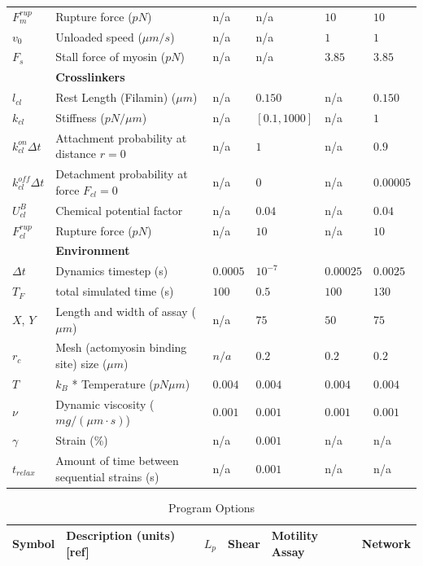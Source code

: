 \documentclass[12pt]{article}
\begin{document}
\begin{table}
\begin{tabular}{|C{1.5cm}|L{7cm}|C{1.5cm}|C{1.5cm}|C{2cm}|C{1.5cm}|}
    $F_m^{rup}$ & Rupture force ($pN$) & n/a & n/a & $10$ & $10$\\
    $v_0$ & Unloaded speed ($\mu m/s$) \cite{kron1986}&  n/a & n/a & $1$ & $1$\\
    $F_s$ & Stall force of myosin ($pN$)\cite{veigel2003}& n/a & n/a & $3.85$ & $3.85$\\
    \hline
    &\bf{Crosslinkers} & & & &\\
    \hline
    $l_{cl}$& Rest Length (Filamin) ($\mu m$)\cite{ferrer2008} & n/a &$0.150$ &n/a & $0.150$\\
    $k_{cl}$ & Stiffness ($pN/\mu m$)& n/a & $[0.1,1000]$ & n/a & $1$ \\
    $k^{on}_{cl}\Delta t$ & Attachment probability at distance $r=0$ & n/a & $1$ & n/a & $0.9$ \\
    $k^{off}_{cl}\Delta t$ & Detachment probability at force $F_{cl}=0$& n/a & $0$ & n/a & $0.00005$ \\
    $U_{cl}^B$ & Chemical potential factor& n/a & $0.04$ &n/a & $0.04$\\
    $F_{cl}^{rup}$& Rupture force ($pN$) \cite{ferrer2008}& n/a & $10$ & n/a & $10$ \\
    \hline
    &\bf{Environment} & & & &\\
    \hline
    $\Delta t$ & Dynamics timestep (s) & $0.0005$ & $10^{-7}$ & $0.00025$ & $0.0025$\\
    $T_F$& total simulated time (s) & $100$ & $0.5$ & $100$ & $130$\\
    $X$, $Y$ & Length and width of assay ($\mu m$)& n/a & $75$ & $50$ & $75$\\
    $r_c$ & Mesh (actomyosin binding site) size ($\mu m$) & $n/a$ & $0.2 $ & $0.2 $ & $0.2$\\
    $T$ & $k_B$ * Temperature ($pN\mu m$)& $0.004$ & $0.004$& $0.004$ & $0.004$\\
    $\nu$ & Dynamic viscosity ($mg/(\mu m \cdot s)$) & $0.001$& $0.001$& $0.001$ & $0.001$ \\
    $\gamma$ & Strain (\%) \cite{stricker2010}& n/a& $0.001$&n/a &n/a\\
    $t_{relax}$ & Amount of time between sequential strains (s)& n/a& $0.001$ &n/a & n/a \\
    \hline
  \end{tabular}
  \label{tab:params}
\end{table}
\begin{table}
  \caption{Program Options}
  \centering
  \begin{tabular}{|C{1.5cm}|L{7cm}|C{1.5cm}|C{1.5cm}|C{2cm}|C{1.5cm}|}
    \hline\hline
    Symbol & Description (units) [ref] & $L_p$ & Shear & Motility Assay & Network \\
    \hline
  \end{tabular}
  \label{tab:options}
\end{table}
\end{document}
